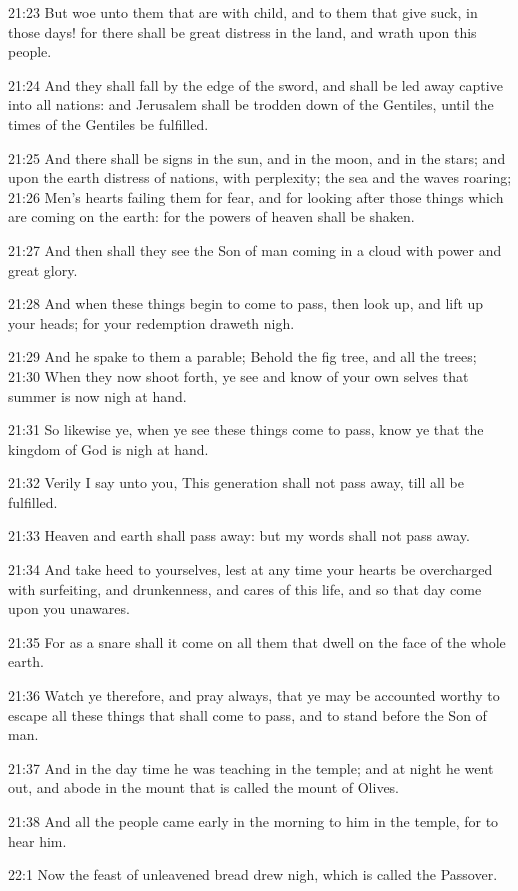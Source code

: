 21:23 But woe unto them that are with child, and to them that give
suck, in those days! for there shall be great distress in the land,
and wrath upon this people.

21:24 And they shall fall by the edge of the sword, and shall be led
away captive into all nations: and Jerusalem shall be trodden down of
the Gentiles, until the times of the Gentiles be fulfilled.

21:25 And there shall be signs in the sun, and in the moon, and in the
stars; and upon the earth distress of nations, with perplexity; the
sea and the waves roaring; 21:26 Men's hearts failing them for fear,
and for looking after those things which are coming on the earth: for
the powers of heaven shall be shaken.

21:27 And then shall they see the Son of man coming in a cloud with
power and great glory.

21:28 And when these things begin to come to pass, then look up, and
lift up your heads; for your redemption draweth nigh.

21:29 And he spake to them a parable; Behold the fig tree, and all the
trees; 21:30 When they now shoot forth, ye see and know of your own
selves that summer is now nigh at hand.

21:31 So likewise ye, when ye see these things come to pass, know ye
that the kingdom of God is nigh at hand.

21:32 Verily I say unto you, This generation shall not pass away, till
all be fulfilled.

21:33 Heaven and earth shall pass away: but my words shall not pass
away.

21:34 And take heed to yourselves, lest at any time your hearts be
overcharged with surfeiting, and drunkenness, and cares of this life,
and so that day come upon you unawares.

21:35 For as a snare shall it come on all them that dwell on the face
of the whole earth.

21:36 Watch ye therefore, and pray always, that ye may be accounted
worthy to escape all these things that shall come to pass, and to
stand before the Son of man.

21:37 And in the day time he was teaching in the temple; and at night
he went out, and abode in the mount that is called the mount of
Olives.

21:38 And all the people came early in the morning to him in the
temple, for to hear him.

22:1 Now the feast of unleavened bread drew nigh, which is called the
Passover.

